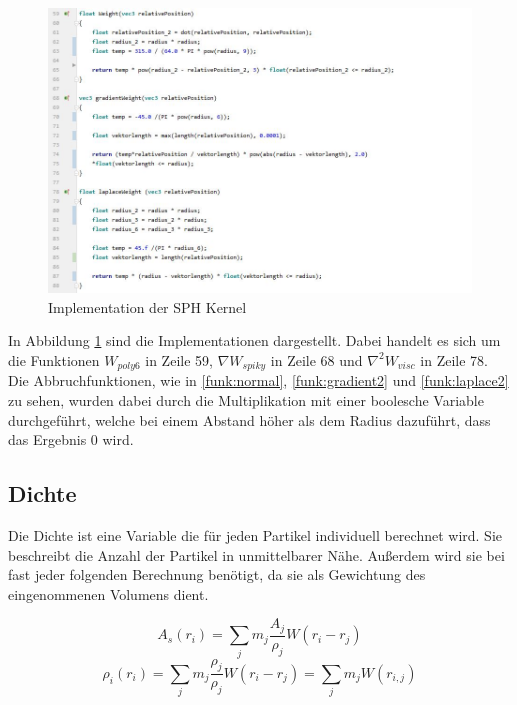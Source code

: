 \documentclass[intern,palatino]{cgBA}
\begin{document}
\begin{figure}[H]
	\centering
	\includegraphics[width=1.35\columnwidth]{Bilder/impKernel.jpg}
	\caption{Implementation der SPH Kernel}
	\label{img:impkernel}
\end{figure}

In Abbildung \ref{img:impkernel} sind die Implementationen dargestellt. Dabei handelt es sich um die Funktionen $W_{poly6}$ in Zeile 59, $\nabla W_{spiky}$ in Zeile 68 und $\nabla^2 W_{visc}$ in Zeile 78.\newline
Die Abbruchfunktionen, wie in \ref{funk:normal}, \ref{funk:gradient2} und \ref{funk:laplace2} zu sehen, wurden dabei durch die Multiplikation mit einer boolesche Variable durchgeführt, welche bei einem Abstand höher als dem Radius dazuführt, dass das Ergebnis 0 wird.


\subsection{Dichte}\label{dichte}

Die Dichte ist eine Variable die für jeden Partikel individuell berechnet wird. Sie beschreibt die Anzahl der Partikel in unmittelbarer Nähe. Außerdem wird sie bei fast jeder folgenden Berechnung benötigt, da sie als Gewichtung des eingenommenen Volumens dient. 

\begin{equation}\label{funk:skalar}
A_s(r_i) = \sum_j m_j \frac{A_j}{\rho_j} W(r_i-r_j)
\end{equation}
\begin{equation}\label{funk:density}
\rho_i(r_i) = \sum_j m_j \frac{\rho_j}{\rho_j} W(r_i-r_j) = \sum_j m_j  W(r_{i,j})
\end{equation}
\end{document}
